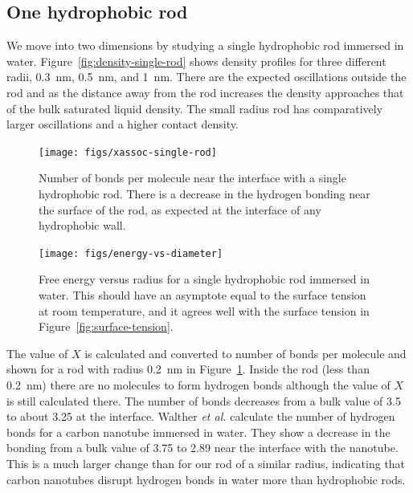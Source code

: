 \documentclass[letterpaper,twocolumn,amsmath,amssymb,prb]{revtex4-1}
\begin{document}
\subsection{One hydrophobic rod}

We move into two dimensions by studying a single hydrophobic rod
immersed in water. Figure~\ref{fig:density-single-rod} shows density
profiles for three different radii, 0.3~nm, 0.5~nm, and 1~nm. There are the
expected oscillations outside the rod and as the distance away from the rod
increases
the density approaches that of the bulk saturated liquid density. The small
radius
rod has comparatively larger oscillations and a higher contact density.

\begin{figure}
\begin{center}
\texttt{[image: figs/xassoc-single-rod]}
\end{center}
\caption{ Number of bonds per molecule near the interface with a single
hydrophobic rod. There is a decrease in the hydrogen bonding near the surface 
of the rod, as expected at the interface of any hydrophobic wall. }
\label{fig:xassoc-single-rod}
\end{figure}

\begin{figure}
\begin{center}
\texttt{[image: figs/energy-vs-diameter]}
\end{center}
\caption{ Free energy versus radius for a single hydrophobic rod
immersed in water. This should have an asymptote equal to the surface
tension at room temperature, and it agrees well with the surface tension in
Figure~\ref{fig:surface-tension}. }
\label{fig:energy-vs-diameter}
\end{figure}

The value of $X$ is calculated and converted to number of bonds per molecule and 
shown for a rod with radius 0.2~nm in Figure~\ref{fig:xassoc-single-rod}. Inside the
rod (less than 0.2~nm) there are no molecules to form hydrogen bonds although the value
of $X$ is still calculated there. The number of bonds decreases from a bulk value of 3.5 
to about 3.25 at the interface. Walther \emph{et al.}\cite{walther2001carbon} 
calculate the number of hydrogen bonds for a carbon nanotube immersed in water.
They show a decrease in the bonding from a bulk value of 3.75 to 2.89 near the 
interface with the nanotube. This is a much larger change than for our 
rod of a similar radius, indicating that carbon nanotubes disrupt hydrogen
bonds in water more than hydrophobic rods.
\end{document}
